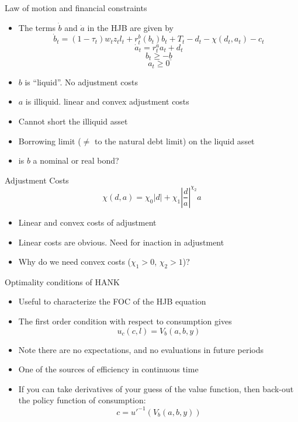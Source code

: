 \documentclass[english,xcolor=svgnames]{beamer}
\begin{document}
\begin{frame}{Law of motion and financial constraints}
\begin{itemize}
\item The terms $\dot{b}$ and $\dot{a}$ in the HJB are given by
\[\dot{b}_t = (1-\tau_t) w_t z_t l_t  + r^b_t(b_t)b_t + T_t - d_t  - \chi(d_t,a_t) - c_t \]
\[\dot{a}_t =r^a_t a_t + d_t  \]
\[b_t \geq - \underline{b}\]
\[a_t \geq 0\]
\item $b$ is ``liquid''. No adjustment costs
\item $a$ is illiquid. linear and convex adjustment costs
\item Cannot short the illiquid asset
\item Borrowing limit ($\neq$ to the natural debt limit) on the liquid asset
\item is $b$ a nominal or real bond?
\end{itemize}
\end{frame}

\begin{frame}{Adjustment Costs}
\[\chi(d,a) = \chi_0 \left| d\right| + \chi_1  \left| \frac{d}{a}\right|^{\chi_2} a   \]
\begin{itemize}
\item Linear and convex costs of adjustment
\item Linear costs are obvious. Need for inaction in adjustment
\item Why do we need convex costs ($\chi_1 >0$, $\chi_2 > 1$)?
\end{itemize}
\end{frame}


\begin{frame}{Optimality conditions of HANK}
\begin{itemize}
\item Useful to characterize the FOC of the HJB equation
\item The first order condition with respect to consumption gives
\[u_c(c,l) = V_b(a,b,y)\]
\item Note there are no expectations, and no evaluations in future periods
\item One of the sources of efficiency in continuous time
\item If you can take derivatives of your guess of the value function, then back-out the policy function of consumption:
\[c = u'^{-1}(V_b(a,b,y))\]

\end{itemize}
\end{frame}
\end{document}
